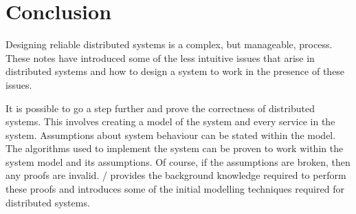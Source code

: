 \section{Conclusion}

Designing reliable distributed systems is a complex, but manageable, process.
These notes have introduced some of the less intuitive issues that arise in distributed systems
and how to design a system to work in the presence of these issues.

It is possible to go a step further and prove the correctness of distributed systems.
This involves creating a model of the system and every service in the system.
Assumptions about system behaviour can be stated within the model.
The algorithms used to implement the system can be proven to work within the system model and its assumptions.
Of course, if the assumptions are broken, then any proofs are invalid.
 /
provides the background knowledge required to perform these proofs
and introduces some of the initial modelling techniques required for distributed systems.
